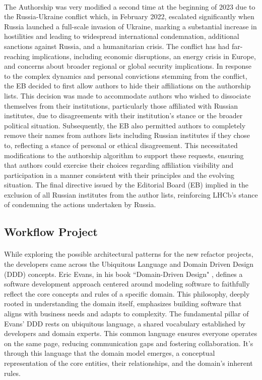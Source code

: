 \paragraph{} The Authorship was very modified a second time at the beginning of 2023 due to the Russia-Ukraine conflict which, in February 2022, escalated significantly when Russia launched a full-scale invasion of Ukraine, marking a substantial increase in hostilities and leading to widespread international condemnation, additional sanctions against Russia, and a humanitarian crisis. The conflict has had far-reaching implications, including economic disruptions, an energy crisis in Europe, and concerns about broader regional or global security implications. In response to the complex dynamics and personal convictions stemming from the conflict, the EB decided to first allow authors to hide their affiliations on the authorship lists. This decision was made to accommodate authors who wished to dissociate themselves from their institutions, particularly those affiliated with Russian institutes, due to disagreements with their institution's stance or the broader political situation. Subsequently, the EB also permitted authors to completely remove their names from authors lists including Russian institutes if they chose to, reflecting a stance of personal or ethical disagreement. This necessitated modifications to the authorship algorithm to support these requests, ensuring that authors could exercise their choices regarding affiliation visibility and participation in a manner consistent with their principles and the evolving situation. The final directive issued by the Editorial Board (EB) implied in the exclusion of all Russian institutes from the author lists, reinforcing LHCb's stance of condemning the actions undertaken by Russia. 



\subsection{Workflow Project}
\label{subsec:workflow_project_cap_2}
\paragraph{} While exploring the possible architectural patterns for the new refactor projects, the developers came across the Ubiquitous Language and Domain Driven Design (DDD) concepts.  Eric Evans, in his book ``Domain-Driven Design"  \cite{evans2003domain}, defines a software development approach centered around modeling software to faithfully reflect the core concepts and rules of a specific domain. This philosophy, deeply rooted in understanding the domain itself, emphasizes building software that aligns with business needs and adapts to complexity. The fundamental pillar of Evans' DDD rests on ubiquitous language, a shared vocabulary established by developers and domain experts. This common language ensures everyone operates on the same page, reducing communication gaps and fostering collaboration. It's through this language that the domain model emerges, a conceptual representation of the core entities, their relationships, and the domain's inherent rules.  

